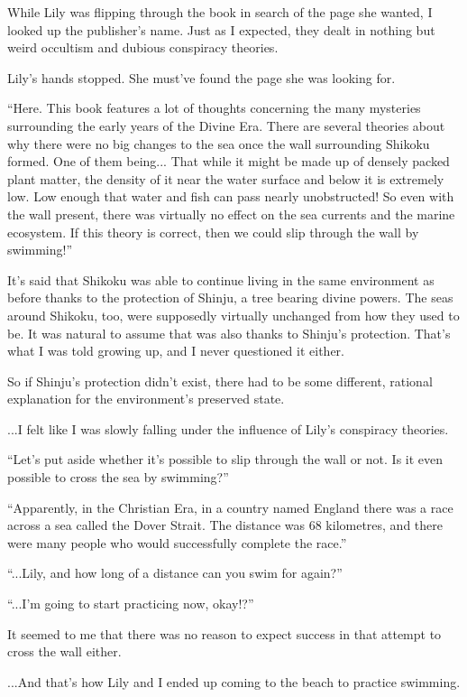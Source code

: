 While Lily was flipping through the book in search of the page she wanted, I looked up the publisher's name. Just as I expected, they dealt in nothing but weird occultism and dubious conspiracy theories.

Lily's hands stopped. She must've found the page she was looking for.

``Here. This book features a lot of thoughts concerning the many mysteries surrounding the early years of the Divine Era. There are several theories about why there were no big changes to the sea once the wall surrounding Shikoku formed. One of them being...  That while it might be made up of densely packed plant matter, the density of it near the water surface and below it is extremely low. Low enough that water and fish can pass nearly unobstructed! So even with the wall present, there was virtually no effect on the sea currents and the marine ecosystem. If this theory is correct, then we could slip through the wall by swimming!''

It's said that Shikoku was able to continue living in the same environment as before thanks to the protection of Shinju, a tree bearing divine powers. The seas around Shikoku, too, were supposedly virtually unchanged from how they used to be. It was natural to assume that was also thanks to Shinju's protection. That's what I was told growing up, and I never questioned it either.

So if Shinju's protection didn't exist, there had to be some different, rational explanation for the environment's preserved state.

...I felt like I was slowly falling under the influence of Lily's conspiracy theories.

``Let's put aside whether it's possible to slip through the wall or not. Is it even possible to cross the sea by swimming?''

``Apparently, in the Christian Era, in a country named England there was a race across a sea called the Dover Strait. The distance was 68 kilometres, and there were many people who would successfully complete the race.''

``...Lily, and how long of a distance can you swim for again?''

``...I'm going to start practicing now, okay!?''

It seemed to me that there was no reason to expect success in that attempt to cross the wall either.

...And that's how Lily and I ended up coming to the beach to practice swimming.

